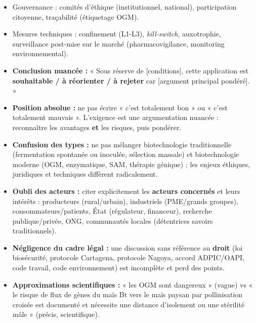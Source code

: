 \documentclass[11pt]{article}
\newcommand{\cle}[1]{{\popxbold\color{popdark}#1}}
\begin{document}
\begin{methode}
\begin{enumerate}
\begin{itemize}
        \item Gouvernance : comités d'éthique (institutionnel, national), participation citoyenne, traçabilité (étiquetage OGM).
        \item Mesures techniques : confinement (L1-L3), \emph{kill-switch}, auxotrophie, surveillance post-mise sur le marché (pharmacovigilance, monitoring environnemental).
        \item \textbf{Conclusion nuancée :} « Sous réserve de [conditions], cette application est \textbf{souhaitable / à réorienter / à rejeter} car [argument principal pondéré]. »
    \end{itemize}
\end{enumerate}
\end{methode}

\begin{attention}
\begin{itemize}
    \item \textbf{Position absolue :} ne pas écrire « c'est totalement bon » ou « c'est totalement mauvais ». L'exigence est une \cle{argumentation nuancée} : reconnaître les avantages \textbf{et} les risques, puis pondérer.
    \item \textbf{Confusion des types :} ne pas mélanger \cle{biotechnologie traditionnelle} (fermentation spontanée ou inoculée, sélection massale) et \cle{biotechnologie moderne} (OGM, enzymatique, SAM, thérapie génique) ; les enjeux éthiques, juridiques et techniques diffèrent radicalement.
    \item \textbf{Oubli des acteurs :} citer explicitement les \textbf{acteurs concernés} et leurs intérêts : producteurs (rural/urbain), industriels (PME/grands groupes), consommateurs/patients, État (régulateur, financeur), recherche publique/privée, ONG, communautés locales (détentrices savoirs traditionnels).
    \item \textbf{Négligence du cadre légal :} une discussion sans référence au \textbf{droit} (loi biosécurité, protocole Cartagena, protocole Nagoya, accord ADPIC/OAPI, code travail, code environnement) est incomplète et perd des points.
    \item \textbf{Approximations scientifiques :} « les OGM sont dangereux » (vague) vs « le risque de flux de gènes du maïs Bt vers le maïs paysan par pollinisation croisée est documenté et nécessite une distance d'isolement ou une stérilité mâle » (précis, scientifique).
\end{itemize}
\end{attention}
\end{document}
